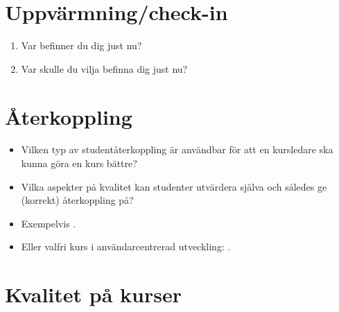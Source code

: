 \mode*

\section{Uppvärmning/check-in}

\begin{frame}
  \begin{question}
    \begin{enumerate}
      \item Var befinner du dig just nu?
      \item Var skulle du vilja befinna dig just nu?
    \end{enumerate}
  \end{question}
\end{frame}


\section{Återkoppling}

\begin{frame}
  \begin{question}
    \begin{itemize}
      \item Vilken typ av studentåterkoppling är användbar för att en 
        kursledare ska kunna göra en kurs bättre?
    \end{itemize}
  \end{question}
\end{frame}

\begin{frame}
  \begin{remark}
    \begin{itemize}
      \item Vilka aspekter på kvalitet kan studenter utvärdera själva och 
        således ge (korrekt) återkoppling på?
      \item Exempelvis 
        .
      \item Eller valfri kurs i användarcentrerad utveckling:
        .
    \end{itemize}
  \end{remark}
\end{frame}


\section{Kvalitet på kurser}


